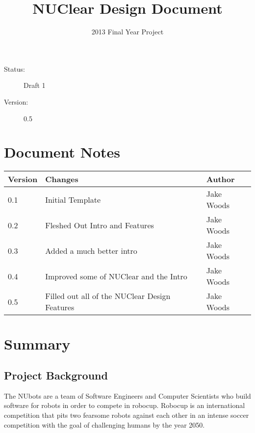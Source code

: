 \documentclass[english,12pt]{scrartcl}
\title{NUClear Design Document}
\author{2013 Final Year Project}
\begin{document}
	\maketitle
	\vfill
	{\large
		\begin{description}
			\item [Status:] Draft 1
			\item [Version:] 0.5
		\end{description}}

	\clearpage
	\tableofcontents

	\section{Document Notes}
		\begin{tabular}{ p{} | p{} | p{} }
			\textbf{Version} & \textbf{Changes} & \textbf{Author} \\
			\hline

			0.1 &
			Initial Template &
			Jake Woods \\
			\hline

			0.2 &
			Fleshed Out Intro and Features &
			Jake Woods \\
			\hline
			
			0.3 &
			Added a much better intro &
			Jake Woods \\
			\hline
			
			0.4 &
			Improved some of NUClear and the Intro &
			Jake Woods \\
			\hline
			
			0.5 &
			Filled out all of the NUClear Design Features &
			Jake Woods \\
			\hline
		\end{tabular}
		
	\clearpage
		
	\section{Summary}
		\subsection{Project Background}
			The NUbots are a team of Software Engineers and Computer Scientists who build software for robots in order to compete in robocup. 
			Robocup is an international competition that pits two fearsome robots against each other in an intense soccer competition with the goal of challenging humans by the year 2050.
			
\end{document}
